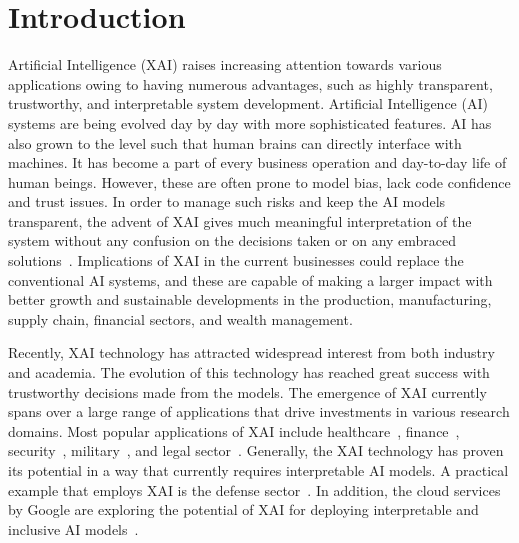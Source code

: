 \documentclass[journal]{IEEEtran}
\begin{document}
\section{Introduction}
 Artificial Intelligence (XAI) raises increasing attention towards various applications owing to having numerous advantages, such as highly transparent, trustworthy, and interpretable system development. 
Artificial Intelligence (AI) systems are being evolved day by day with more sophisticated features. AI has also grown to the level such that human brains can directly interface with machines. It has become a part of every business operation and day-to-day life of human beings. However, these are often prone to model bias, lack code confidence and trust issues. In order to manage such risks and keep the AI models transparent, the advent of XAI gives much meaningful interpretation of the system without any confusion on the decisions taken or on any embraced solutions~\cite{mohseni2021multidisciplinary}. Implications of XAI in the current businesses could replace the conventional AI systems, and these are capable of making a larger impact with better growth and sustainable developments in the production, manufacturing, supply chain, financial sectors, and wealth management.

Recently, XAI technology has attracted widespread interest from both industry and academia. The evolution of this technology has reached great success with trustworthy decisions made from the models. The emergence of XAI currently spans over a large range of applications that drive investments in various research domains. Most popular applications of XAI include healthcare~\cite{nazar2021systematic}, finance~\cite{kute2021deep}, security~\cite{zolanvari2021trust}, military~\cite{warren2020friend}, and legal sector~\cite{deeks2019judicial}. Generally, the XAI technology has proven its potential in a way that currently requires interpretable AI models. A practical example that employs XAI is the defense sector~\cite{gunning2019darpa}. In addition, the cloud services by Google are exploring the potential of XAI for deploying interpretable and inclusive AI models~\cite{kumara2022focloud}. 
\end{document}

